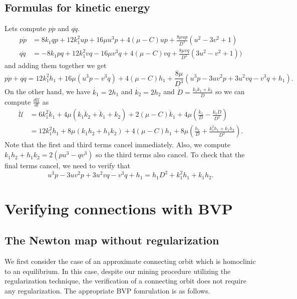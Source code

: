 \documentclass[10pt]{article}
\begin{document}
\subsection{Formulas for kinetic energy}   
Lets compute $p \dot p$ and $q \dot q$. 
\begin{align*}
p \dot p & = 8k_1qp + 12k_1^2 up + 16 \mu u^3 p + 4(\mu - C) up + \frac{8 \mu u p}{D^3} \left(u^2 - 3v^2 + 1\right) \\
q \dot q & = -8k_1 pq + 12k_1^2 vq - 16 \mu v^3 q + 4(\mu-C) vq + \frac{8 \mu vq}{D^3} \left(3u^2 - v^2 + 1\right))
\end{align*}
and adding them together we get
\[
p \dot p + q \dot q= 12k_1^2 h_1 + 16 \mu (u^3 p - v^3 q) + 4(\mu - C) h_1 + \frac{8 \mu }{D^3} \left(u^3p - 3uv^2p + 3u^2 vq - v^3q + h_1\right).
\]
On the other hand, we have $\dot{k_1} = 2h_1$ and $\dot{k_2} = 2h_2$ and $\dot D = \frac{k_1 \dot k_1 + \dot k_2}{D}$ so we can compute $\frac{d \mathcal{U}}{dt}$ as
\begin{align*}
\dot {\mathcal{U}} & = 6k_1^2 \dot k_1 + 4 \mu(k_1 \dot k_2 + \dot k_1 + k_2) + 2(\mu - C) \dot k_1 + 4 \mu \left(\frac{\dot k_1}{D} - \frac{ k_1 \dot D}{D^2}  \right) \\ 
& = 12 k_1^2 h_1 + 8 \mu (k_1h_2 + h_1k_2) + 4(\mu - C) h_1 + 8 \mu (\frac{h_1}{ D} + \frac{k_1^2 h_1 + k_1 h_2}{D^3}).
\end{align*}
Note that the first and third terms cancel immediately. Also, we compute $k_1h_2 + h_1k_2 = 2(pu^3 - qv^3)$ so the third terms also cancel. To check that the final terms cancel, we need to verify that
\[
 u^3p - 3uv^2p + 3u^2 vq - v^3q + h_1 = h_1D^2 + k_1^2h_1 + k_1h_2.
\]

\section{Verifying connections with BVP}

\subsection{The Newton map without regularization}
We first consider the case of an approximate connecting orbit which is homoclinic to an equilibrium. In this case, despite our mining procedure utilizing the regularization technique, the verification of a connecting orbit does not require any regularization. The appropriate BVP fomrulation is as follows. 
\end{document}
